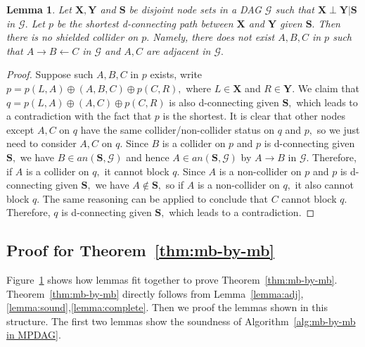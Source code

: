 \documentclass{article}
\newtheorem{lemma}{Lemma}
\begin{document}
\begin{lemma}
\label{lemma:shortest+collider}
Let $\mathbf{X}, \mathbf{Y}$ and $\mathbf{S}$ be disjoint node sets in a DAG $\mathcal{G}$ such that $\mathbf{X}\perp \mathbf{Y} | \mathbf{S}$ in $\mathcal{G}.$ Let $p$ be the shortest d-connecting path between $\mathbf{X}$ and $\mathbf{Y}$ given $\mathbf{S}.$ Then there is no shielded collider on $p.$ Namely, there does not exist $A,B,C$ in $p$ such that $A\to B\leftarrow C$ in $\mathcal{G}$ and $A,C$ are adjacent in $\mathcal{G}.$
\end{lemma}	
\begin{proof}
Suppose such $A,B,C$ in $p$ exists, write $p=p(L,A)\oplus (A,B,C)\oplus p(C,R),$ where $L\in\mathbf{X}$ and $R\in\mathbf{Y}.$ We claim that $q=p(L,A)\oplus (A,C)\oplus p(C,R)$ is also d-connecting given $\mathbf{S},$ which leads to a contradiction with the fact that $p$ is the shortest. It is clear that other nodes except $A,C$ on $q$ have the same collider/non-collider status on $q$ and $p,$ so we just need to consider $A,C$ on $q.$ Since $B$ is a collider on $p$ and $p$ is d-connecting given $\mathbf{S},$ we have $B\in an(\mathbf{S},\mathcal{G})$ and hence $A\in an(\mathbf{S},\mathcal{G})$ by $A\to B$ in $\mathcal{G}.$ Therefore, if $A$ is a collider on $q,$ it cannot block $q.$ Since $A$ is a non-collider on $p$ and $p$ is d-connecting given $\mathbf{S},$ we have $A\not\in\mathbf{S},$ so if $A$ is a non-collider on $q,$ it also cannot block $q.$ The same reasoning can be applied to conclude that $C$ cannot block $q.$ Therefore, $q$ is d-connecting given $\mathbf{S},$ which leads to a contradiction.
\end{proof}

\subsection{Proof for Theorem~\ref{thm:mb-by-mb}}

\begin{figure}[omitted: a diagram of this paper's results, not reproduced here]\label{fig:proof for thm1}\end{figure}

Figure~\ref{fig:proof for thm1} shows how lemmas fit together to prove Theorem~\ref{thm:mb-by-mb}. Theorem~\ref{thm:mb-by-mb} directly follows from Lemma~\ref{lemma:adj},\ref{lemma:sound},\ref{lemma:complete}. Then we proof the lemmas shown in this structure. The first two lemmas show the soundness of Algorithm~\ref{alg:mb-by-mb in MPDAG}.
\end{document}
